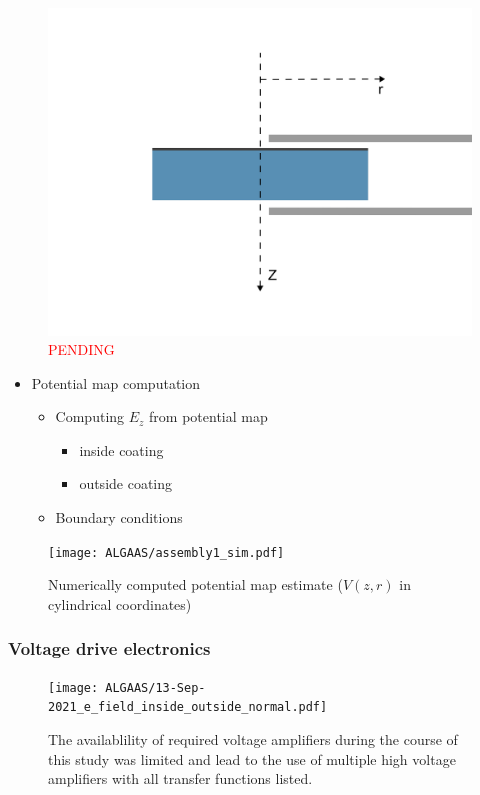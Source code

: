 \begin{figure}[H]
  \centering
  \includegraphics[width=.65\textwidth]{figs/ALGAAS/laplace_coord_test.pdf}
  \caption{\textcolor{red}{PENDING}}
  \label{fig:laplace_coords}
\end{figure}
\begin{itemize}
    \item Potential map computation 	
        \begin{itemize}
	    \item Computing $E_z$ from potential map
		\begin{itemize}
		    \item inside coating
		    \item outside coating
		\end{itemize}
	    \item Boundary conditions
	\end{itemize}
\end{itemize}

\begin{figure}[H]
  \texttt{[image: ALGAAS/assembly1\_sim.pdf]}
  \caption{Numerically computed potential map estimate ($V(z,r)$ in cylindrical coordinates)}
  \label{fig:poisson_calc_output}
\end{figure}

\subsubsection{Voltage drive electronics}

\begin{figure}[H]
    \texttt{[image: ALGAAS/13-Sep-2021\_e\_field\_inside\_outside\_normal.pdf]}
    \caption{The availablility of required voltage amplifiers during the course of this study was limited and lead to the use of multiple high voltage amplifiers with all transfer functions listed.}
\label{fig:Ez}
\end{figure}


